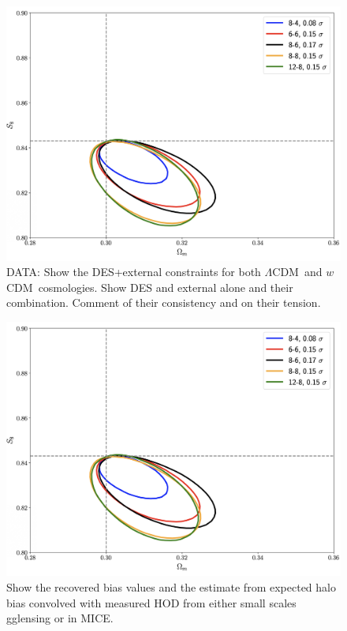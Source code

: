 \documentclass[fleqn,usenatbib]{mnras}
\newcommand{\lcdm}{$\Lambda$CDM}
\newcommand{\wcdm}{$w$CDM}
\begin{document}
\begin{figure}
\includegraphics[width=\columnwidth,draft]{figs/temp.png}
\caption[]{DATA: Show the DES+external constraints for both \lcdm \ and \wcdm \ cosmologies. Show DES and external alone and their combination. Comment of their consistency and on their tension. }
\label{fig:bias_relation}
\end{figure}



\begin{figure}
\includegraphics[width=\columnwidth,draft]{figs/temp.png}
\caption[]{Show the recovered bias values and the estimate from expected halo bias convolved with measured HOD from either small scales gglensing or in MICE. }
\label{fig:bias_relation}
\end{figure}
\end{document}
